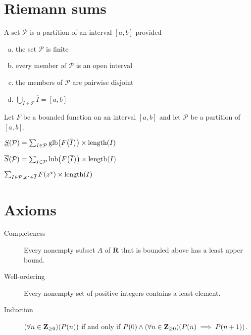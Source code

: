 \documentclass[letterpaper,landscape,9pt,fleqn]{extarticle}
\newcommand{\reals}{\mathbf{R}}
\newcommand{\integers}{\mathbf{Z}}
\newcommand{\glb}{\mathrm{glb}}
\newcommand{\lub}{\mathrm{lub}}
\newcommand{\length}{\mathrm{length}}
\DeclarePairedDelimiter{\parens}{\lparen}{\rparen}
\newenvironment{alphalist}{
  \begin{enumerate}[(a)]
    \addtolength{\itemsep}{-1.0\itemsep}}
  {\end{enumerate}}
\begin{document}
\begin{multicols*}{3}
\section*{Riemann sums}
\begin{description}[\itemsep=0em]
    \item[Partition] A set $\mathcal{P}$ is a partition of an 
    interval $[a,b]$ provided
    \begin{alphalist}
        \item the set  $\mathcal{P}$ is finite
        \item every member of $\mathcal{P}$ is an open interval
        \item the members of $\mathcal{P}$ are pairwise disjoint
        \item $\underset{I \in \mathcal{P}} \bigcup \overline{I} = [a,b]$
    \end{alphalist}
\end{description}
Let $F$ be a bounded function on an interval $[a,b]$ and let
$\mathcal{P}$ be a partition of $[a,b]$. 
\begin{description}[\itemsep=0em]    
    \item[Lower sum] $\underline{S}(\mathcal{P}) = \sum_{I \in \mathcal{P}} \glb \parens*{F \parens*{\overline{I}}} \times  \length(I)$
    \item[Upper sum] $\overline{S}(\mathcal{P}) = \sum_{I \in \mathcal{P}} \lub \parens*{F \parens*{\overline{I}}} \times  \length(I)$
    \item[Riemann sum] $\sum_{I \in \mathcal{P}, x^\star \in \overline{I}} F \parens*{x^\star} \times  \length(I)$
\end{description}

\section*{Axioms}
\begin{description}
    \item[Completeness] Every nonempty subset $A$ of $\reals$ that is 
    bounded above has a least upper bound.
    \item[Well-ordering]  Every nonempty set of positive integers 
        contains a least element.
    \item[Induction] $\parens*{\forall n \in \integers_{\geq 0}}(P(n))$ if and only if
    $ P(0) \land \parens*{\forall n \in 
    \integers_{\geq 0}}  \parens*{P(n) \implies P(n+1)}$.
\end{description}


\end{multicols*}
\end{document}
